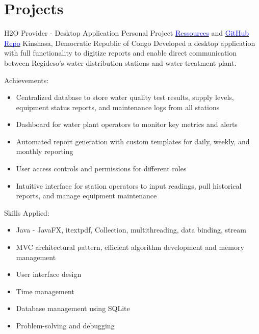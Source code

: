 \section{Projects}

    {H2O Provider - Desktop Application}
    {Personal Project}
    {\href{https://disk.yandex.ru/d/oncxNLbWMF80EA}{\textcolor{blue}{Ressources}} and 
    \href{https://github.com/DanGlChris/H2O-Provider}{\textcolor{blue}{GitHub Repo}} 
     Kinshasa, Democratic Republic of Congo
    }
    {
    \newline
    Developed a desktop application with full functionality to digitize reports and enable direct communication
     between Regideso's water distribution stations and water treatment plant.}
    {      
    Achievements:
    \begin{itemize}
        \item Centralized database to store water quality test results, supply levels, equipment status reports, and maintenance logs from all stations
        \item Dashboard for water plant operators to monitor key metrics and alerts
        \item Automated report generation with custom templates for daily, weekly, and monthly reporting
        \item User access controls and permissions for different roles
        \item Intuitive interface for station operators to input readings, pull historical reports, and manage equipment maintenance
    \end{itemize}
    Skills Applied:
    \begin{itemize}
        \item Java - JavaFX, itextpdf, Collection, multithreading, data binding, stream 
        \item MVC architectural pattern, efficient algorithm development and memory management
        \item User interface design
        \item Time management
        \item Database management using SQLite
        \item Problem-solving and debugging
    \end{itemize}
    }

